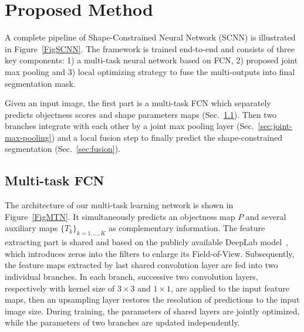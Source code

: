 \section{Proposed Method}
\label{sec:method}

A complete pipeline of Shape-Constrained Neural Network (SCNN) is illustrated in Figure~\ref{FigSCNN}.
The framework is trained end-to-end and consists of three key components:
1) a multi-task neural network based on FCN,
2) proposed joint max pooling and
3) local optimizing strategy to fuse the multi-outputs into final segmentation mask.
%

Given an input image, the first part is a multi-task FCN which separately predicts objectness scores and shape parameters maps (Sec.~\ref{sec:multi-task-fcn}).
Then two branches integrate with each other by a joint max pooling layer (Sec.~\ref{sec:joint-max-pooling}) and a local fusion step to finally predict the shape-constrained segmentation (Sec.~\ref{sec:fusion}).

\subsection{Multi-task FCN}
\label{sec:multi-task-fcn}

The architecture of our multi-task learning network is shown in Figure~\ref{FigMTN}.
It simultaneously predicts an objectness map $P$ and several auxiliary maps $\{T_k\}_{k=1,\ldots,K}$ as complementary information.
The feature extracting part is shared and based on the publicly available DeepLab model~\cite{Chen2014a}, which introduces zeros into the filters to enlarge its Field-of-View.
Subsequently, the feature maps extracted by last shared convolution layer are fed into two individual branches.
In each branch, successive two convolution layers, respectively with kernel size of $3\times3$ and $1\times1$, are applied to the input feature maps, then an upsampling layer restores the resolution of predictions to the input image size.
During training, the parameters of shared layers are jointly optimized, while the parameters of two branches are updated independently.

